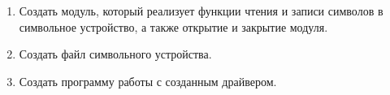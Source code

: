 \renewcommand{\labelenumii}{\theenumii}
\renewcommand{\theenumii}{\theenumi.\arabic{enumii}.}

\begin{enumerate}
	\item Создать модуль, который реализует функции чтения и записи символов в символьное устройство, а также открытие и закрытие модуля.
	\item Создать файл символьного устройства.
	\item Создать программу работы с созданным драйвером.
\end{enumerate}
